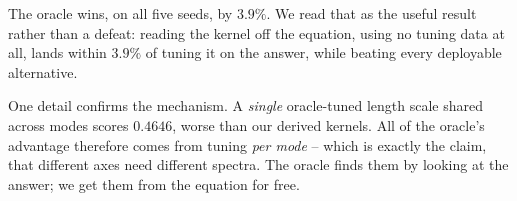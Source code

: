 The oracle wins, on all five seeds, by $3.9\%$.  We read that as the useful
result rather than a defeat: reading the kernel off the equation, using no tuning
data at all, lands within $3.9\%$ of tuning it on the answer, while beating every
deployable alternative.

One detail confirms the mechanism.  A \emph{single} oracle-tuned length scale
shared across modes scores $0.4646$, worse than our derived kernels.  All of the
oracle's advantage therefore comes from tuning \emph{per mode} -- which is
exactly the claim, that different axes need different spectra.  The oracle finds
them by looking at the answer; we get them from the equation for free.

